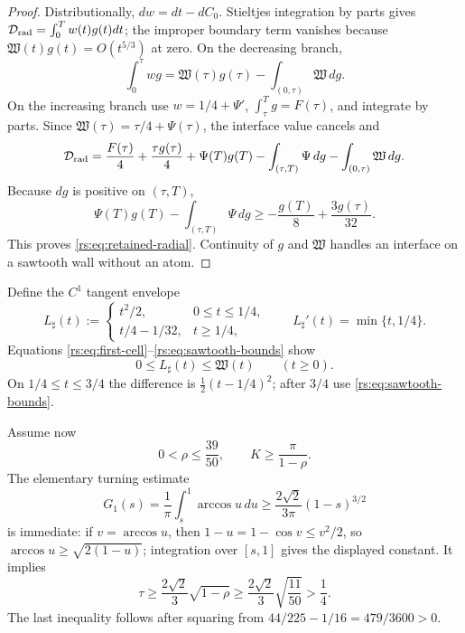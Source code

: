 \begin{proof}
Distributionally, $dw=dt-dC_0$.  Stieltjes integration by parts gives
$\mathcal D_{\rm rad}=\int_0^Tw(t)g(t)dt$; the improper boundary term
vanishes because $\mathfrak W(t)g(t)=O(t^{5/3})$ at zero.  On the
decreasing branch,
\[
 \int_0^\tau wg
 =\mathfrak W(\tau)g(\tau)
  -\int_{(0,\tau)}\mathfrak W\,dg.
\]
On the increasing branch use $w=1/4+\Psi'$,
$\int_\tau^Tg=F(\tau)$, and integrate by parts.  Since
$\mathfrak W(\tau)=\tau/4+\Psi(\tau)$, the interface value cancels and
\[
 \mathcal D_{\rm rad}
 =\frac{F(\tau)}4+\frac{\tau g(\tau)}4
  +\Psi(T)g(T)-\int_{(\tau,T)}\Psi\,dg
  -\int_{(0,\tau)}\mathfrak W\,dg.
\]
Because $dg$ is positive on $(\tau,T)$,
\[
 \Psi(T)g(T)-\int_{(\tau,T)}\Psi\,dg
 \geq-\frac{g(T)}8+\frac{3g(\tau)}{32}.
\]
This proves \eqref{rs:eq:retained-radial}.  Continuity of $g$ and
$\mathfrak W$ handles an interface on a sawtooth wall without an atom.
\end{proof}

Define the $C^1$ tangent envelope
\begin{equation}
 L_\sharp(t):=
 \begin{cases}
 t^2/2,&0\leq t\leq1/4,\\[2pt]
 t/4-1/32,&t\geq1/4,
 \end{cases}
 \qquad
 L_\sharp'(t)=\min\{t,1/4\}.
 \label{rs:eq:L-sharp}
\end{equation}
Equations \eqref{rs:eq:first-cell}--\eqref{rs:eq:sawtooth-bounds} show
\begin{equation}
 0\leq L_\sharp(t)\leq\mathfrak W(t)
 \qquad(t\geq0).
 \label{rs:eq:L-order}
\end{equation}
On $1/4\leq t\leq3/4$ the difference is
$\tfrac12(t-1/4)^2$; after $3/4$ use
\eqref{rs:eq:sawtooth-bounds}.

Assume now
\begin{equation}
 0<\rho\leq\frac{39}{50},
 \qquad K\geq\frac\pi{1-\rho}.
 \label{rs:eq:global-domain}
\end{equation}
The elementary turning estimate
\begin{equation}
 G_1(s)=\frac1\pi\int_s^1\arccos u\,du
 \geq\frac{2\sqrt2}{3\pi}(1-s)^{3/2}
 \label{rs:eq:G-turning}
\end{equation}
is immediate: if $v=\arccos u$, then
$1-u=1-\cos v\leq v^2/2$, so
$\arccos u\geq\sqrt{2(1-u)}$; integration over $[s,1]$ gives the displayed
constant.
It implies
\[
 \tau\geq\frac{2\sqrt2}{3}\sqrt{1-\rho}
 \geq\frac{2\sqrt2}{3}\sqrt{\frac{11}{50}}>\frac14.
\]
The last inequality follows after squaring from
$44/225-1/16=479/3600>0$.

